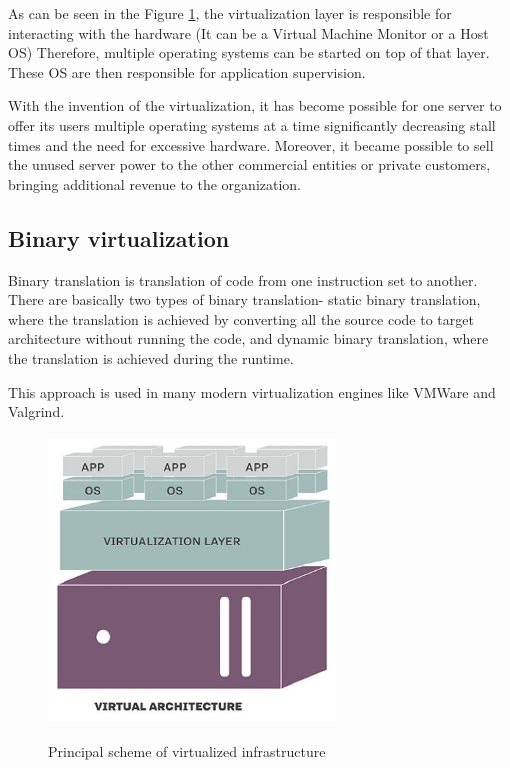 As can be seen in the Figure \ref{fig:TraditionalAndVirtualInfra1},
the virtualization layer is responsible for interacting with the hardware
(It can be a Virtual Machine Monitor or a Host OS)
Therefore, multiple operating systems can be started on top of that layer.
These OS are then responsible for application supervision.

With the invention of the virtualization,
it has become possible for one server to
offer its users multiple operating systems at a time
significantly decreasing stall times and the need for excessive hardware.
Moreover, it became possible to sell the unused
server power to the other commercial entities or private customers,
bringing additional revenue to the organization.

\subsection{Binary virtualization}

Binary translation is translation of code from one
instruction set to another. There are basically two types of binary translation-
static binary translation, where the translation is achieved by
converting all the source code to target
architecture without running the code, and
dynamic binary translation, where the translation is achieved during the runtime.

This approach is used in many modern
virtualization engines like VMWare and Valgrind\cite{SWVirtPrez}.

\begin{figure}
\includegraphics[height=3in, width=3in]{virtualized}
\caption{Principal scheme of virtualized infrastructure}
\cite{TraditionalAndVirtualInfra1}
\label{fig:TraditionalAndVirtualInfra1}
\end{figure}

